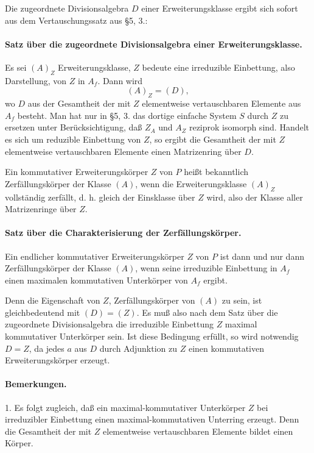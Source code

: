 \documentclass[11pt]{article}
\begin{document}
Die zugeordnete Divisionsalgebra \(D\) einer Erweiterungsklasse ergibt sich sofort aus dem Vertauschungssatz aus §5, 3.:

\paragraph{Satz über die zugeordnete Divisionsalgebra einer Erweiterungsklasse.}
Es sei \((A)_Z\) Erweiterungsklasse, \(Z\) bedeute eine irreduzible Einbettung, also Darstellung, von \(Z\) in \(A_f\). Dann wird
\[
        (A)_Z=(D),
\]
wo \(D\) aus der Gesamtheit der mit \(Z\) elementweise vertauschbaren Elemente aus \(A_f\) besteht. Man hat nur in §5, 3. das dortige einfache System \(S\) durch \(Z\) zu ersetzen unter Berücksichtigung, daß \(Z_A\) und \(A_Z\) reziprok isomorph sind. Handelt es sich um reduzible Einbettung von \(Z\), so ergibt die Gesamtheit der mit \(Z\) elementweise vertauschbaren Elemente einen Matrizenring über \(D\).

Ein kommutativer Erweiterungskörper \(Z\) von \(P\) heißt bekanntlich Zerfällungskörper der Klasse \((A)\), wenn die Erweiterungsklasse \((A)_Z\) vollständig zerfällt, d. h. gleich der Einsklasse über \(Z\) wird, also der Klasse aller Matrizenringe über \(Z\).

\paragraph{Satz über die Charakterisierung der Zerfällungskörper.}
Ein endlicher kommutativer Erweiterungskörper \(Z\) von \(P\) ist dann und nur dann Zerfällungskörper der Klasse \((A)\), wenn seine irreduzible Einbettung in \(A_f\) einen maximalen kommutativen Unterkörper von \(A_f\) ergibt.

Denn die Eigenschaft von \(Z\), Zerfällungskörper von \((A)\) zu sein, ist gleichbedeutend mit \((D)=(Z)\). Es muß also nach dem Satz über die zugeordnete Divisionsalgebra die irreduzible Einbettung \(Z\) maximal kommutativer Unterkörper sein. Ist diese Bedingung erfüllt, so wird notwendig \(D=Z\), da jedes \(a\) aus \(D\) durch Adjunktion zu \(Z\) einen kommutativen Erweiterungskörper erzeugt.

\paragraph{Bemerkungen.}
1. Es folgt zugleich, daß ein maximal-kommutativer Unterkörper \(Z\) bei irreduzibler Einbettung einen maximal-kommutativen Unterring erzeugt. Denn die Gesamtheit der mit \(Z\) elementweise vertauschbaren Elemente bildet einen Körper.
\end{document}
